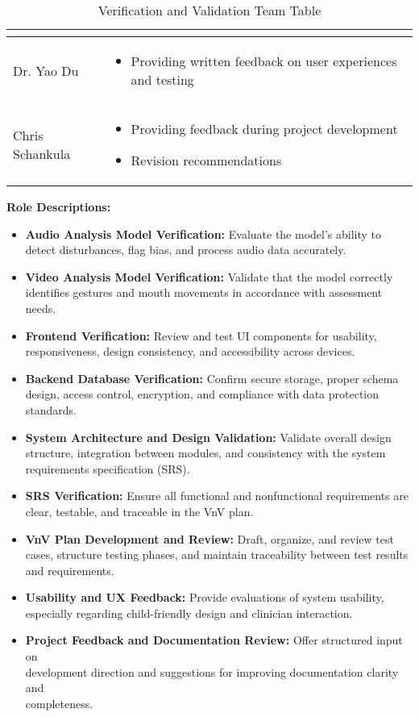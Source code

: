 \documentclass[12pt, titlepage]{article}
\begin{document}
\begin{table}[h!]
\begin{tabular}{ | m{5cm} | m{8cm} | }
\begin{itemize}
    \end{itemize}\\
    \hline
    Dr. Yao Du & \vspace{2mm}\begin{itemize}
      \item Providing written feedback on user experiences and testing
    \end{itemize}\\
    \hline
    Chris Schankula & \vspace{2mm}\begin{itemize}
      \item Providing feedback during project development
      \item Revision recommendations
    \end{itemize}\\
    \bottomrule
  \end{tabular}
  \caption{Verification and Validation Team Table}
\end{table}

\vspace{1em}

\noindent\textbf{Role Descriptions:}
\begin{itemize}
  \item \textbf{Audio Analysis Model Verification:} Evaluate the model’s ability to detect disturbances, flag bias, and process audio data accurately.
  \item \textbf{Video Analysis Model Verification:} Validate that the model correctly identifies gestures and mouth movements in accordance with assessment needs.
  \item \textbf{Frontend Verification:} Review and test UI components for usability, responsiveness, design consistency, and accessibility across devices.
  \item \textbf{Backend Database Verification:} Confirm secure storage, proper schema design, access control, encryption, and compliance with data protection standards.
  \item \textbf{System Architecture and Design Validation:} Validate overall design structure, integration between modules, and consistency with the system requirements specification (SRS).
  \item \textbf{SRS Verification:} Ensure all functional and nonfunctional requirements are clear, testable, and traceable in the VnV plan.
  \item \textbf{VnV Plan Development and Review:} Draft, organize, and review test cases, structure testing phases, and maintain traceability between test results and requirements.
  \item \textbf{Usability and UX Feedback:} Provide evaluations of system usability, especially regarding child-friendly design and clinician interaction.
  \item \textbf{Project Feedback and Documentation Review:} Offer structured input on \\ development direction and suggestions for improving documentation clarity and \\ completeness.
\end{itemize}
\end{document}

